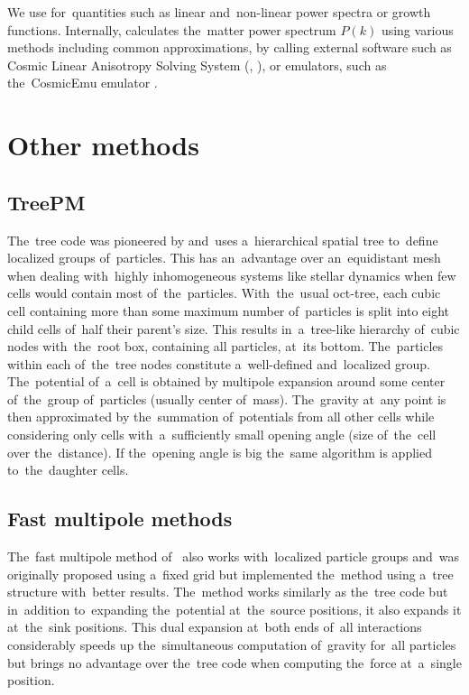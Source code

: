 We use  for~quantities such as linear and~non-linear power spectra or growth functions. Internally,  calculates the~matter power spectrum  $P(k)$ using various methods including common approximations, by calling external software such as Cosmic Linear Anisotropy Solving System (, \textcite{class}), or emulators, such as the~CosmicEmu emulator \parencite{Heitmann:2015xma}.

\section{Other methods}
\subsection{TreePM}
The~tree code was pioneered by \textcite{1986Natur.324..446B} and~uses a~hierarchical spatial tree to~define localized groups of~particles. This has an~advantage over an~equidistant mesh when dealing with~highly inhomogeneous systems like stellar dynamics when few cells would contain most of~the~particles. With~the~usual oct-tree, each cubic cell containing more than some maximum number of~particles is split into eight child cells of~half their parent's size. This results in~a~tree-like hierarchy of~cubic nodes with~the~root box, containing all particles, at~its bottom. The~particles within each of~the~tree nodes constitute a~well-defined and~localized group. The~potential of~a~cell is obtained by multipole expansion around some center of~the~group of~particles (usually center of~mass). The~gravity at~any point is then approximated by the~summation of~potentials from all other cells while considering only cells with~a~sufficiently small opening angle (size of~the~cell over the~distance). If the~opening angle is big the~same algorithm is applied to~the~daughter cells.
\subsection{Fast multipole methods}
The~fast multipole method of~\textcite{1987JCoPh..73..325G} also works with~localized particle groups and~was originally proposed using a~fixed grid but \textcite{2000ApJ...536L..39D} implemented the~method using a~tree structure with~better results. The~method works similarly as the~tree code but in~addition to~expanding the~potential at~the~source positions, it also expands it at~the~sink positions. This dual expansion at~both ends of~all interactions considerably speeds up the~simultaneous computation of~gravity for~all particles but brings no advantage over the~tree code when computing the~force at~a~single position.

